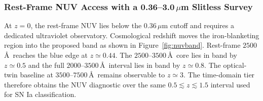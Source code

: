 \subsubsection{Rest-Frame NUV Access with a 0.36--3.0\,$\mu$m Slitless Survey}

At $z=0$, the rest-frame NUV lies below the $0.36\,\mu$m cutoff and requires a dedicated ultraviolet observatory. Cosmological redshift moves the iron-blanketing region into the proposed band as shown in Figure~\ref{fig:nuvband}. Rest-frame $2500$\,\AA\ reaches the blue edge at $z\simeq0.44$. The $2500$--$3500$\,\AA\ core lies in band by $z\simeq0.5$ and the full $2000$--$3500$\,\AA\ interval lies in band by $z\simeq0.8$. The optical-twin baseline at $3500$--$7500$\,\AA\ remains observable to $z\simeq3$. The time-domain tier therefore obtains the NUV diagnostic over the same $0.5\lesssim z\lesssim1.5$ interval used for SN Ia classification.

